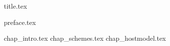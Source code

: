 \documentclass[12pt,letterpaper,oneside]{scrbook}
\begin{document}
\frontmatter
{title.tex}

\tableofcontents

{preface.tex}

\mainmatter

{chap_intro.tex}
{chap_schemes.tex}
{chap_hostmodel.tex}

\appendix

\renewcommand{\thechapter}{\Alph{chapter}}

\backmatter
\end{document}
